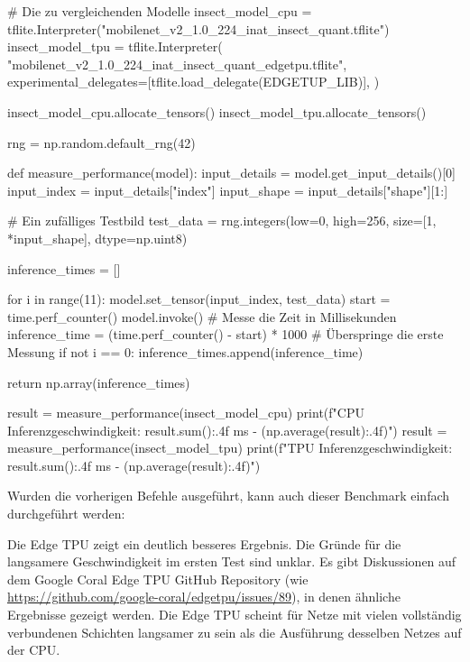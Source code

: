 \begin{pythoncode}
# Die zu vergleichenden Modelle
insect_model_cpu = tflite.Interpreter("mobilenet_v2_1.0_224_inat_insect_quant.tflite")
insect_model_tpu = tflite.Interpreter(
    "mobilenet_v2_1.0_224_inat_insect_quant_edgetpu.tflite",
    experimental_delegates=[tflite.load_delegate(EDGETUP_LIB)],
)

insect_model_cpu.allocate_tensors()
insect_model_tpu.allocate_tensors()

rng = np.random.default_rng(42)

def measure_performance(model):
    input_details = model.get_input_details()[0]
    input_index = input_details["index"]
    input_shape = input_details["shape"][1:]

    # Ein zufälliges Testbild
    test_data = rng.integers(low=0, high=256, size=[1, *input_shape], dtype=np.uint8)

    inference_times = []

    for i in range(11):
        model.set_tensor(input_index, test_data)
        start = time.perf_counter()
        model.invoke()
        # Messe die Zeit in Millisekunden
        inference_time = (time.perf_counter() - start) * 1000
        # Überspringe die erste Messung
        if not i == 0:
            inference_times.append(inference_time)

    return np.array(inference_times)

result = measure_performance(insect_model_cpu)
print(f"CPU Inferenzgeschwindigkeit: {result.sum():.4f} ms - ({np.average(result):.4f})")
result = measure_performance(insect_model_tpu)
print(f"TPU Inferenzgeschwindigkeit: {result.sum():.4f} ms - ({np.average(result):.4f})")
\end{pythoncode}
Wurden die vorherigen Befehle ausgeführt, kann auch dieser Benchmark einfach durchgeführt
werden:
Die Edge TPU zeigt ein deutlich besseres Ergebnis.
Die Gründe für die langsamere Geschwindigkeit im ersten Test
sind unklar. Es gibt Diskussionen auf dem Google Coral Edge TPU
GitHub Repository (wie
\url{https://github.com/google-coral/edgetpu/issues/89}), in denen
ähnliche Ergebnisse gezeigt werden.
Die Edge TPU scheint für Netze mit vielen vollständig verbundenen Schichten
langsamer zu sein als die Ausführung desselben Netzes auf der CPU.
